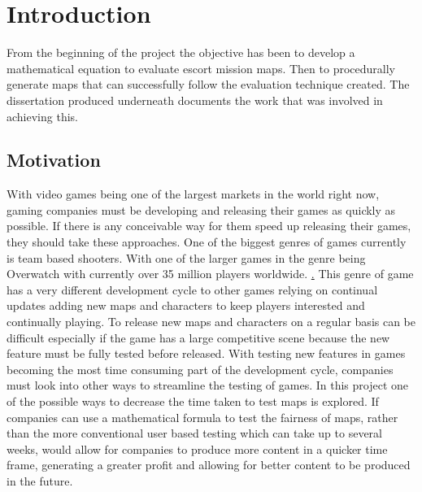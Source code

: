 \documentclass{article}
\begin{document}
\title{{}}
\author{Adam Blance}

\maketitle

\begin{abstract}
The abstract text goes here.
\end{abstract}

\section{Introduction}
From the beginning of the project the objective has been to develop a mathematical equation to evaluate escort mission maps. Then to procedurally generate maps that can successfully follow the evaluation technique created. The dissertation produced underneath documents the work that was involved in achieving this.
\subsection{Motivation}
With video games being one of the largest markets in the world right now, gaming companies must be developing and releasing their games as quickly as possible. If there is any conceivable way for them speed up releasing their games, they should take these approaches.
\vspace{5mm} 
\newline  
One of the biggest genres of games currently is team based shooters. With one of the larger games in the genre being Overwatch with currently over 35 million players worldwide. \href{https://twitter.com/PlayOverwatch/status/919925924769906688}. This genre of game has a very different development cycle to other games relying on continual updates adding new maps and characters to keep players interested and continually playing. To release new maps and characters on a regular basis can be difficult especially if the game has a large competitive scene because the new feature \vspace{5mm} must be fully tested before released.
\newline  
With testing new features in games becoming the most time consuming part of the development cycle, companies must look into other ways to streamline the testing of games. In this project one of the possible ways to decrease the time taken to test maps is explored. If companies can use a mathematical formula to test the fairness of maps, rather than the more conventional user based testing which can take up to several weeks, would allow for companies to produce more content in a quicker time frame, generating a greater profit and allowing for better content to be produced in the future. 
\end{document}
